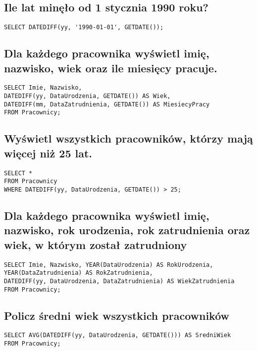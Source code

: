 \documentclass{article}
\begin{document}
\subsection{Ile lat minęło od 1 stycznia 1990 roku?}

\begin{verbatim}
SELECT DATEDIFF(yy, '1990-01-01', GETDATE());
\end{verbatim}

\subsection{Dla każdego pracownika wyświetl imię, nazwisko, wiek oraz ile miesięcy pracuje.}

\begin{verbatim}
SELECT Imie, Nazwisko,
DATEDIFF(yy, DataUrodzenia, GETDATE()) AS Wiek,
DATEDIFF(mm, DataZatrudnienia, GETDATE()) AS MiesiecyPracy
FROM Pracownicy;
\end{verbatim}

\subsection{Wyświetl wszystkich pracowników, którzy mają więcej niż 25 lat.}

\begin{verbatim}
SELECT *
FROM Pracownicy
WHERE DATEDIFF(yy, DataUrodzenia, GETDATE()) > 25;
\end{verbatim}

\subsection{Dla każdego pracownika wyświetl imię, nazwisko, rok urodzenia, rok zatrudnienia oraz wiek, w którym został zatrudniony}

\begin{verbatim}
SELECT Imie, Nazwisko, YEAR(DataUrodzenia) AS RokUrodzenia,
YEAR(DataZatrudnienia) AS RokZatrudnienia,
DATEDIFF(yy, DataUrodzenia, DataZatrudnienia) AS WiekZatrudnienia
FROM Pracownicy;
\end{verbatim}

\subsection{Policz średni wiek wszystkich pracowników}

\begin{verbatim}
SELECT AVG(DATEDIFF(yy, DataUrodzenia, GETDATE())) AS SredniWiek
FROM Pracownicy;
\end{verbatim}
\end{document}
